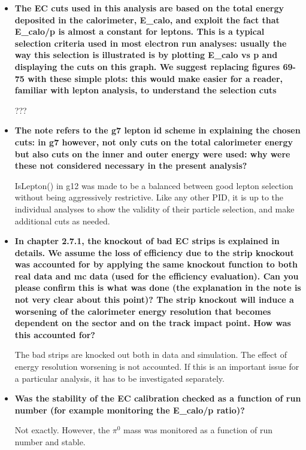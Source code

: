 \documentclass[ 12 pt]{article}
\begin{document}
\begin{itemize}
\item \textbf{The EC cuts used in this analysis are based on the total energy deposited in
the calorimeter, E\_calo, and exploit the fact that E\_calo/p is almost a constant
for leptons. This is a typical selection criteria used in most electron run
analyses: usually the way this selection is illustrated is by plotting E\_calo vs p
and displaying the cuts on this graph. We suggest replacing figures 69-75
with these simple plots: this would make easier for a reader, familiar with
lepton analysis, to understand the selection cuts}


???


\item \textbf{The note refers to the g7 lepton id scheme in explaining the chosen cuts: in
g7 however, not only cuts on the total calorimeter energy but also cuts on the
inner and outer energy were used: why were these not considered necessary
in the present analysis?}

IsLepton() in g12 was made to be a balanced between good
lepton selection without being aggressively restrictive.  Like any other
PID, it is up to the individual analyses to show the validity of their
particle selection, and make additional cuts as needed.



\item \textbf{In chapter 2.7.1, the knockout of bad EC strips is explained in details. We
assume the loss of efficiency due to the strip knockout was accounted for by
applying the same knockout function to both real data and mc data (used for
the efficiency evaluation). Can you please confirm this is what was done (the
explanation in the note is not very clear about this point)? The strip knockout
will induce a worsening of the calorimeter energy resolution that becomes
dependent on the sector and on the track impact point. How was this
accounted for?}

The bad strips are knocked out both in data and simulation. The effect of energy resolution worsening is not accounted. If this is an important issue for a particular analysis, it has to be investigated separately.

\item \textbf{Was the stability of the EC calibration checked as a function of run number
(for example monitoring the E\_calo/p ratio)?}

Not exactly. However, the $\pi^0$ mass was monitored as a function of run number and stable.



\end{itemize}
\end{document}

